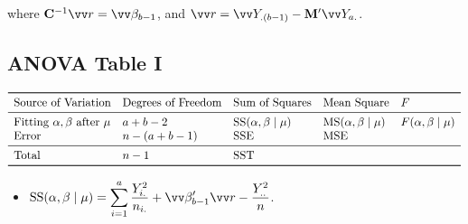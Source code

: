 where $ \Matrix{C}^{-1}\Vector{r}=\Vector{\beta}_{b-1} $,
and $ \Vector{r} =\Vector{Y}_{.(b-1)}-\Matrix{M}'\Vector{Y}_{a.} $.
\subsection*{ANOVA Table I}
\[ \begin{array}{lllll}
        \toprule
        \text{Source of Variation}                   & \text{Degrees of Freedom} & \text{Sum of Squares}           & \text{Mean Square}              & F                       \\
        \midrule
        \text{Fitting }\alpha,\beta\text{ after }\mu & a+b-2                     & \text{SS}(\alpha,\beta\mid \mu) & \text{MS}(\alpha,\beta\mid \mu) & F(\alpha,\beta\mid \mu) \\
        \text{Error}                                 & n-(a+b-1)                 & \SSE                            & \MSE                                                      \\
        \midrule
        \text{Total}                                 & n-1                       & \SST                                                                                        \\
        \bottomrule
    \end{array} \]
\begin{itemize}
    \item $ \displaystyle \text{SS}(\alpha,\beta\mid \mu)=\sum_{i=1}^{a}\frac{Y_{i.}^2}{n_{i.}}+\Vector{\beta}_{b-1}'\Vector{r}-\frac{Y_{..}^2}{n} $.
\end{itemize}

